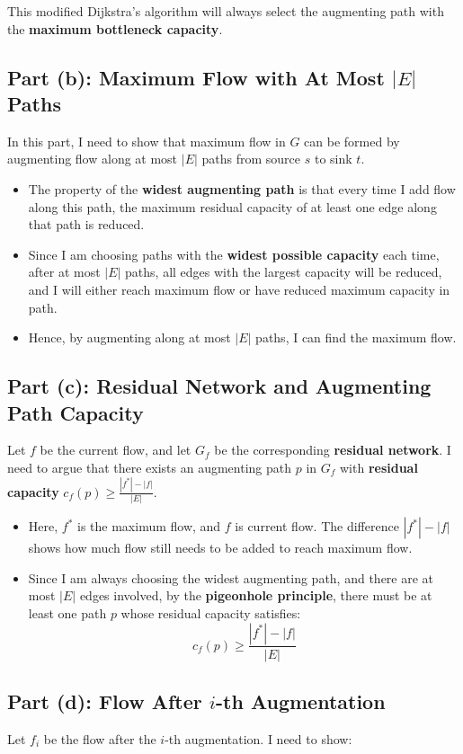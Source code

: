 \documentclass[10pt,letter,notitlepage]{article}
\begin{document}
\begin{Answer}
This modified Dijkstra's algorithm will always select the augmenting path with the \textbf{maximum bottleneck capacity}.

\subsection*{Part (b): Maximum Flow with At Most $|E|$ Paths}
In this part, I need to show that maximum flow in $G$ can be formed by augmenting flow along at most $|E|$ paths from source $s$ to sink $t$.

\begin{itemize}
    \item The property of the \textbf{widest augmenting path} is that every time I add flow along this path, the maximum residual capacity of at least one edge along that path is reduced.
    \item Since I am choosing paths with the \textbf{widest possible capacity} each time, after at most $|E|$ paths, all edges with the largest capacity will be reduced, and I will either reach maximum flow or have reduced maximum capacity in path.
    \item Hence, by augmenting along at most $|E|$ paths, I can find the maximum flow.
\end{itemize}

\subsection*{Part (c): Residual Network and Augmenting Path Capacity}
Let $f$ be the current flow, and let $G_f$ be the corresponding \textbf{residual network}. I need to argue that there exists an augmenting path $p$ in $G_f$ with \textbf{residual capacity} $c_f(p) \geq \frac{|f^*| - |f|}{|E|}$.

\begin{itemize}
    \item Here, $f^*$ is the maximum flow, and $f$ is current flow. The difference $|f^*| - |f|$ shows how much flow still needs to be added to reach maximum flow.
    \item Since I am always choosing the widest augmenting path, and there are at most $|E|$ edges involved, by the \textbf{pigeonhole principle}, there must be at least one path $p$ whose residual capacity satisfies:
    \[
    c_f(p) \geq \frac{|f^*| - |f|}{|E|}
    \]
\end{itemize}

\subsection*{Part (d): Flow After $i$-th Augmentation}
Let $f_i$ be the flow after the $i$-th augmentation. I need to show:


\end{Answer}
\end{document}
